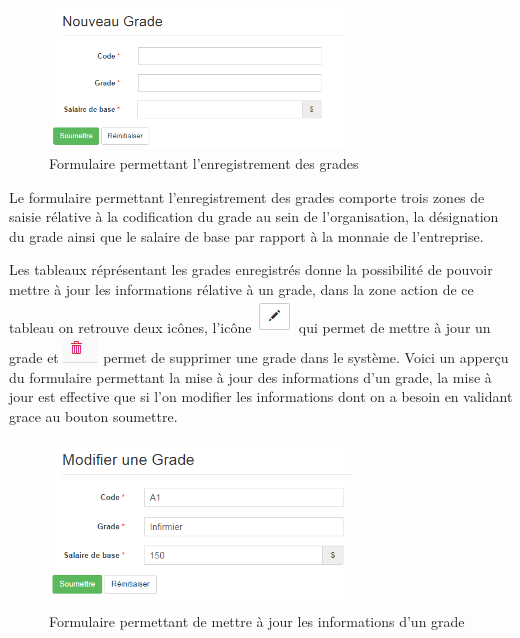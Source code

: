 \documentclass[12pt,a4paper]{report}
\begin{document}
\begin{figure}[h]
\begin{center}
\includegraphics[width=8cm]{pic/NewGrade.png}
\end{center}
\caption{Formulaire permettant l'enregistrement des grades}
\label{Formulaire permettant l'enregistrement des grades}
\end{figure} 

Le formulaire permettant l'enregistrement des grades comporte trois zones de saisie rélative à la codification du grade au sein de l'organisation, la désignation du grade ainsi que le salaire de base par rapport à la monnaie de l'entreprise. 

Les tableaux réprésentant les grades enregistrés donne la possibilité de pouvoir mettre à jour les informations rélative à un grade, dans la zone action de ce tableau on retrouve deux icônes, l'icône \includegraphics[scale=0.7]{pic/EditBlack.png} qui permet de mettre à jour un grade et \includegraphics[scale=0.7]{pic/DeleteWRed.png} permet de supprimer une grade dans le système.
Voici un apperçu du formulaire permettant la mise à jour des informations d'un grade, la mise à jour est effective que si l'on modifier les informations dont on a besoin en validant grace au bouton soumettre. 

\begin{figure}[h]
\begin{center}
\includegraphics[width=8cm]{pic/UpdGrade.png}
\end{center}
\caption{Formulaire permettant de mettre à jour les informations d'un grade}
\label{Formulaire permettant de mettre à jour les informations d'un grade}
\end{figure} 
\end{document}
